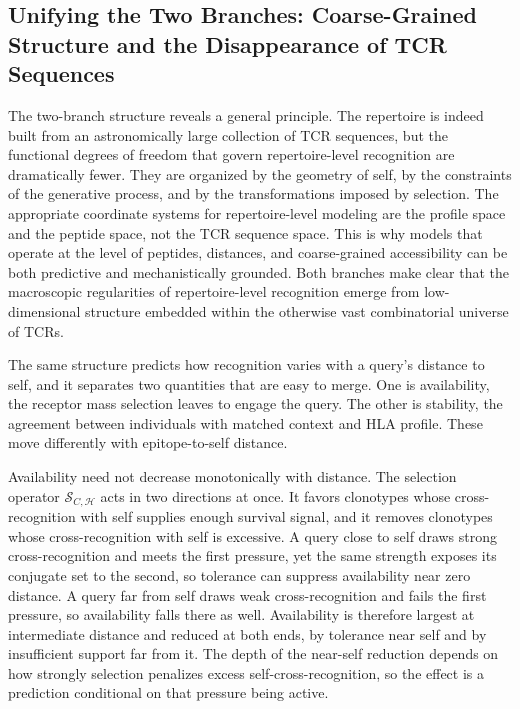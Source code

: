 \documentclass[11pt]{article}
\begin{document}
\subsection{Unifying the Two Branches: Coarse-Grained Structure and the Disappearance of TCR Sequences}



The two-branch structure reveals a general principle. The repertoire is indeed built from an astronomically large collection of TCR sequences, but the functional degrees of freedom that govern repertoire-level recognition are dramatically fewer. They are organized by the geometry of self, by the constraints of the generative process, and by the transformations imposed by selection. The appropriate coordinate systems for repertoire-level modeling are the profile space and the peptide space, not the TCR sequence space. This is why models that operate at the level of peptides, distances, and coarse-grained accessibility can be both predictive and mechanistically grounded. Both branches make clear that the macroscopic regularities of repertoire-level recognition emerge from low-dimensional structure embedded within the otherwise vast combinatorial universe of TCRs.

The same structure predicts how recognition varies with a query's distance to self, and it separates two quantities that are easy to merge. One is availability, the receptor mass selection leaves to engage the query. The other is stability, the agreement between individuals with matched context and HLA profile. These move differently with epitope-to-self distance.

Availability need not decrease monotonically with distance. The selection operator \(\mathcal{S}_{C,\mathcal{H}}\) acts in two directions at once. It favors clonotypes whose cross-recognition with self supplies enough survival signal, and it removes clonotypes whose cross-recognition with self is excessive. A query close to self draws strong cross-recognition and meets the first pressure, yet the same strength exposes its conjugate set to the second, so tolerance can suppress availability near zero distance. A query far from self draws weak cross-recognition and fails the first pressure, so availability falls there as well. Availability is therefore largest at intermediate distance and reduced at both ends, by tolerance near self and by insufficient support far from it. The depth of the near-self reduction depends on how strongly selection penalizes excess self-cross-recognition, so the effect is a prediction conditional on that pressure being active.
\end{document}

